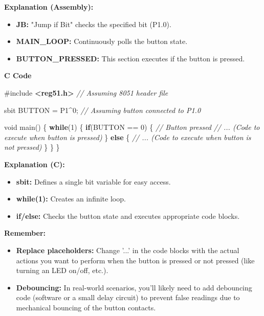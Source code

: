 \documentclass[
]{article}
\newenvironment{Shaded}{}{}
\newcommand{\CommentTok}[1]{\textcolor[rgb]{0.38,0.63,0.69}{\textit{#1}}}
\newcommand{\ControlFlowTok}[1]{\textcolor[rgb]{0.00,0.44,0.13}{\textbf{#1}}}
\newcommand{\DataTypeTok}[1]{\textcolor[rgb]{0.56,0.13,0.00}{#1}}
\newcommand{\DecValTok}[1]{\textcolor[rgb]{0.25,0.63,0.44}{#1}}
\newcommand{\ImportTok}[1]{\textcolor[rgb]{0.00,0.50,0.00}{\textbf{#1}}}
\newcommand{\NormalTok}[1]{#1}
\newcommand{\OperatorTok}[1]{\textcolor[rgb]{0.40,0.40,0.40}{#1}}
\newcommand{\PreprocessorTok}[1]{\textcolor[rgb]{0.74,0.48,0.00}{#1}}
\begin{document}
\textbf{Explanation (Assembly):}

\begin{itemize}
\item
  \textbf{JB:} "Jump if Bit" checks the specified bit (P1.0).
\item
  \textbf{MAIN\_LOOP:} Continuously polls the button state.
\item
  \textbf{BUTTON\_PRESSED:} This section executes if the button is
  pressed.
\end{itemize}

\textbf{C Code}

\begin{Shaded}
\begin{Highlighting}[]
\PreprocessorTok{\#include }\ImportTok{\textless{}reg51.h\textgreater{}}\PreprocessorTok{  }\CommentTok{// Assuming 8051 header file}

\NormalTok{sbit BUTTON }\OperatorTok{=}\NormalTok{ P1}\OperatorTok{\^{}}\DecValTok{0}\OperatorTok{;} \CommentTok{// Assuming button connected to P1.0}

\DataTypeTok{void}\NormalTok{ main}\OperatorTok{()} \OperatorTok{\{}
    \ControlFlowTok{while}\OperatorTok{(}\DecValTok{1}\OperatorTok{)} \OperatorTok{\{}
        \ControlFlowTok{if}\OperatorTok{(}\NormalTok{BUTTON }\OperatorTok{==} \DecValTok{0}\OperatorTok{)} \OperatorTok{\{} \CommentTok{// Button pressed}
            \CommentTok{// ... (Code to execute when button is pressed)}
        \OperatorTok{\}} \ControlFlowTok{else} \OperatorTok{\{}
            \CommentTok{// ... (Code to execute when button is not pressed)}
        \OperatorTok{\}}
    \OperatorTok{\}}
\OperatorTok{\}}
\end{Highlighting}
\end{Shaded}

\textbf{Explanation (C):}

\begin{itemize}
\item
  \textbf{sbit:} Defines a single bit variable for easy access.
\item
  \textbf{while(1):} Creates an infinite loop.
\item
  \textbf{if/else:} Checks the button state and executes appropriate
  code blocks.
\end{itemize}

\textbf{Remember:}

\begin{itemize}
\item
  \textbf{Replace placeholders:} Change '...' in the code blocks with
  the actual actions you want to perform when the button is pressed or
  not pressed (like turning an LED on/off, etc.).
\item
  \textbf{Debouncing:} In real-world scenarios, you'll likely need to
  add debouncing code (software or a small delay circuit) to prevent
  false readings due to mechanical bouncing of the button contacts.
\end{itemize}
\end{document}
